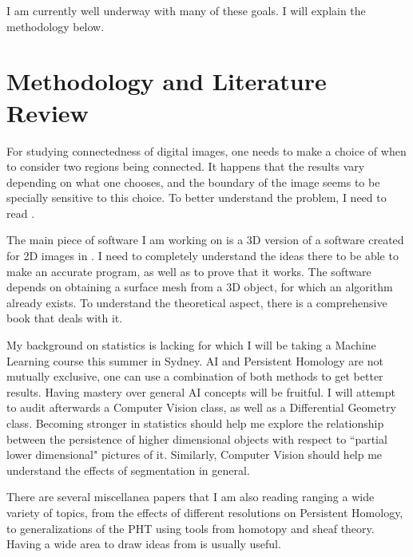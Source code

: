 \documentclass[12pt]{article}
\theoremstyle{theorem}
\theoremstyle{definition}
\theoremstyle{remark}
\theoremstyle{gremark}
\theoremstyle{discussion}
\theoremstyle{notation}
\begin{document}
	I am currently well underway with many of these goals. I will explain the methodology below. 
	
	\section*{Methodology and Literature Review}
	
		For studying connectedness of digital images, one needs to make a choice of when to consider two regions being connected. It happens that the results vary depending on what one chooses, and the boundary of the image seems to be specially sensitive to this choice. To better understand the problem, I need to read \cite{Bleile_2022}.
		
		The main piece of software I am working on is a 3D version of a software created for 2D images in \cite{turner_extended_2024}. I need to completely understand the ideas there to be able to make an accurate program, as well as to prove that it works. The software depends on obtaining a surface mesh from a 3D object, for which an algorithm already exists. To understand the theoretical aspect, there is a comprehensive book \cite{wenger_isosurfaces_2013} that deals with it.
		
		My background on statistics is lacking for which I will be taking a Machine Learning course this summer in Sydney. AI and Persistent Homology are not mutually exclusive, one can use a combination of both methods to get better results. Having mastery over general AI concepts will be fruitful. I will attempt to audit afterwards a Computer Vision class, as well as a Differential Geometry class. Becoming stronger in statistics should help me explore the relationship between the persistence of higher dimensional objects with respect to ``partial lower dimensional" pictures of it. Similarly, Computer Vision should help me understand the effects of segmentation in general.
		
		There are several miscellanea papers that I am also reading ranging a wide variety of topics, from the effects of different resolutions on Persistent Homology, to generalizations of the PHT using tools from homotopy and sheaf theory. Having a wide area to draw ideas from is usually useful.
		
	
		
	
	
	
\end{document}
